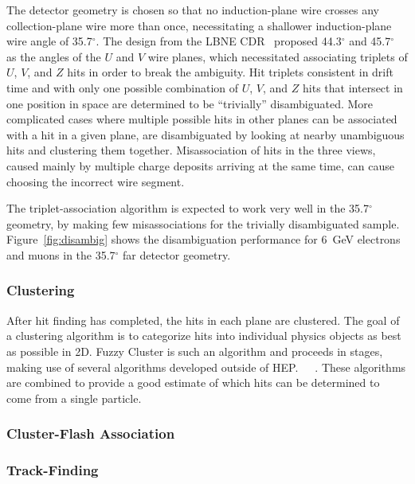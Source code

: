 The detector geometry is chosen so that no induction-plane wire
crosses any collection-plane wire more than once, necessitating a
shallower induction-plane wire angle of 35.7$^\circ$.  The design from
the LBNE CDR~\cite{lbnecdr} proposed 44.3$^\circ$ and 45.7$^\circ$ as
the angles of the $U$ and $V$ wire planes, which necessitated
associating triplets of $U$, $V$, and $Z$ hits in order to break the
ambiguity.  Hit triplets consistent in drift time and with only one
possible combination of $U$, $V$, and $Z$ hits that intersect in one
position in space are determined to be ``trivially'' disambiguated.
More complicated cases where multiple possible hits in other planes
can be associated with a hit in a given plane, are disambiguated by
looking at nearby unambiguous hits and clustering them together.
Misassociation of hits in the three views, caused mainly by multiple
charge deposits arriving at the same time, can cause choosing the
incorrect wire segment.

The triplet-association algorithm is expected to work very well in the
35.7$^\circ$ geometry, by making few misassociations for the trivially
disambiguated sample.  Figure~\ref{fig:disambig} shows the
disambiguation performance for 6~GeV electrons and muons in the
35.7$^\circ$ far detector geometry.

\subsubsection{Clustering}


After hit finding has completed, the hits in each plane are
clustered. The goal of a clustering algorithm is to categorize hits
into individual physics objects as best as possible in 2D. Fuzzy
Cluster is such an algorithm and proceeds in stages, making use of
several algorithms developed outside of
HEP.~\cite{flame}~\cite{ppht}~\cite{dbscan}. These algorithms are
combined to provide a good estimate of which hits can be determined to
come from a single particle.
\subsubsection{Cluster-Flash Association}

\subsubsection{Track-Finding}

